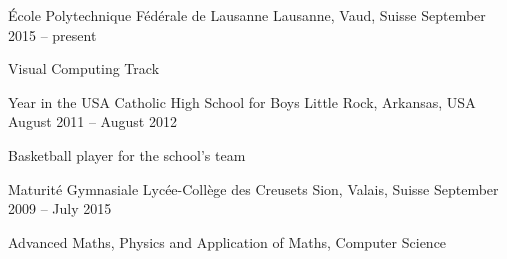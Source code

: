 

\begin{cventries}

 
{École Polytechnique Fédérale de Lausanne}
{Lausanne, Vaud, Suisse}
{September 2015 -- present}{
  \begin{cvitems}
  \item{Visual Computing Track}
  \end{cvitems}
  }
  
  \cventry
{Year in the USA}
{Catholic High School for Boys}
{Little Rock, Arkansas, USA}
{August 2011 -- August 2012}
{\begin{cvitems}
\item{Basketball player for the school's team}
\end{cvitems}}

\cventry
{Maturité Gymnasiale}
{Lycée-Collège des Creusets}
{Sion, Valais, Suisse}
{September 2009 -- July 2015}
{
	\begin{cvitems}
	\item{Advanced Maths, Physics and Application of Maths, Computer Science} 
	\end{cvitems}
    }
    




   

\end{cventries}
